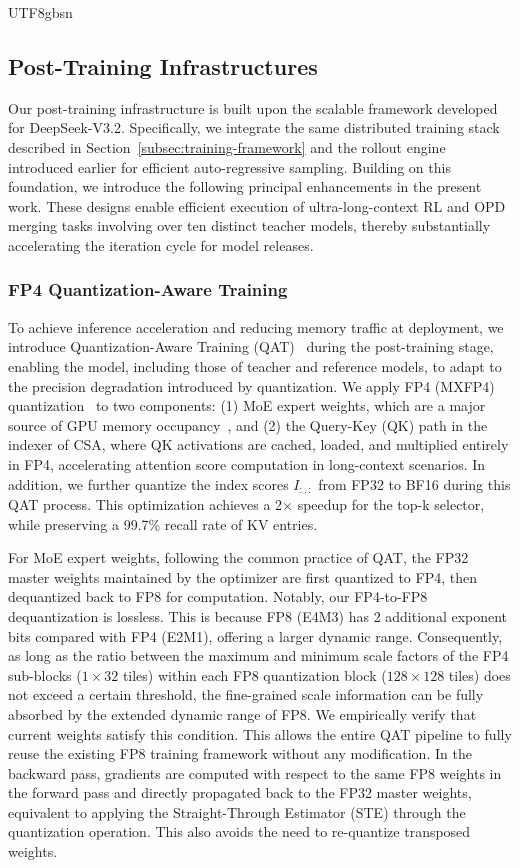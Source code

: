 \documentclass[11pt, a4paper, logo, copyright, nonumbering]{deepseek}
\newcommand{\dsviiiII}{DeepSeek-V3.2}
\newcommand{\csa}{CSA}
\begin{document}
\begin{CJK*}{UTF8}{gbsn}
\subsection{Post-Training Infrastructures} 

Our post-training infrastructure is built upon the scalable framework developed for \dsviiiII{}. 
Specifically, we integrate the same distributed training stack described in Section~\ref{subsec:training-framework} and the rollout engine introduced earlier for efficient auto-regressive sampling. 
Building on this foundation, we introduce the following principal enhancements in the present work.
These designs enable efficient execution of ultra-long-context RL and OPD merging tasks involving over ten distinct teacher models, thereby substantially accelerating the iteration cycle for model releases.

\subsubsection{FP4 Quantization-Aware Training}
\label{subsec:fp4}
To achieve inference acceleration and reducing memory traffic at deployment, we introduce Quantization-Aware Training (QAT)~\citep{QAT} during the post-training stage, enabling the model, including those of teacher and reference models, to adapt to the precision degradation introduced by quantization. 
We apply FP4 (MXFP4) quantization~\citep{OCP_MXFormat} to two components: (1) MoE expert weights, which are a major source of GPU memory occupancy~\citep{gpt_oss}, and (2) the Query-Key (QK) path in the indexer of \csa{}, where QK activations are cached, loaded, and multiplied entirely in FP4, accelerating attention score computation in long-context scenarios.
In addition, we further quantize the index scores $I_{:, :}$ from FP32 to BF16 during this QAT process. 
This optimization achieves a 2$\times$ speedup for the top-k selector, while preserving a 99.7\% recall rate of KV entries.

For MoE expert weights, following the common practice of QAT, the FP32 master weights maintained by the optimizer are first quantized to FP4, then dequantized back to FP8 for computation. 
Notably, our FP4-to-FP8 dequantization is lossless. 
This is because FP8 (E4M3) has 2 additional exponent bits compared with FP4 (E2M1), offering a larger dynamic range. 
Consequently, as long as the ratio between the maximum and minimum scale factors of the FP4 sub-blocks ($1\times 32$ tiles) within each FP8 quantization block ($128\times 128$ tiles) does not exceed a certain threshold, the fine-grained scale information can be fully absorbed by the extended dynamic range of FP8.
We empirically verify that current weights satisfy this condition. 
This allows the entire QAT pipeline to fully reuse the existing FP8 training framework without any modification. 
In the backward pass, gradients are computed with respect to the same FP8 weights in the forward pass and directly propagated back to the FP32 master weights, equivalent to applying the Straight-Through Estimator (STE) through the quantization operation. 
This also avoids the need to re-quantize transposed weights.


\end{CJK*}
\end{document}
